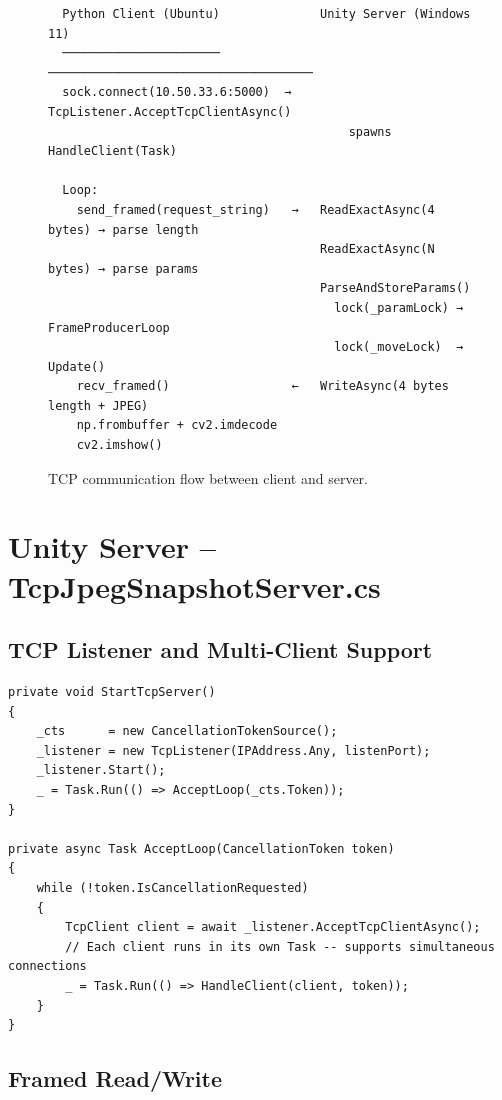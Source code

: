 \documentclass[12pt,a4paper]{article}
\begin{document}
\begin{figure}[H]
\centering
\begin{verbatim}
  Python Client (Ubuntu)              Unity Server (Windows 11)
  ──────────────────────              ─────────────────────────────────────
  sock.connect(10.50.33.6:5000)  →   TcpListener.AcceptTcpClientAsync()
                                          spawns HandleClient(Task)

  Loop:
    send_framed(request_string)   →   ReadExactAsync(4 bytes) → parse length
                                      ReadExactAsync(N bytes) → parse params
                                      ParseAndStoreParams()
                                        lock(_paramLock) → FrameProducerLoop
                                        lock(_moveLock)  → Update()
    recv_framed()                 ←   WriteAsync(4 bytes length + JPEG)
    np.frombuffer + cv2.imdecode
    cv2.imshow()
\end{verbatim}
\caption{TCP communication flow between client and server.}
\end{figure}

\section{Unity Server -- TcpJpegSnapshotServer.cs}

\subsection{TCP Listener and Multi-Client Support}

\begin{lstlisting}[style=csharp, caption={Starting the TCP listener bound to all interfaces.}]
private void StartTcpServer()
{
    _cts      = new CancellationTokenSource();
    _listener = new TcpListener(IPAddress.Any, listenPort);
    _listener.Start();
    _ = Task.Run(() => AcceptLoop(_cts.Token));
}

private async Task AcceptLoop(CancellationToken token)
{
    while (!token.IsCancellationRequested)
    {
        TcpClient client = await _listener.AcceptTcpClientAsync();
        // Each client runs in its own Task -- supports simultaneous connections
        _ = Task.Run(() => HandleClient(client, token));
    }
}
\end{lstlisting}

\subsection{Framed Read/Write}
\end{document}
